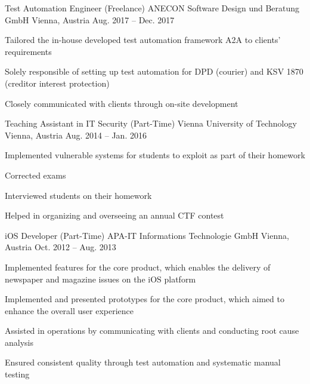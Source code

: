 \begin{cventries}

\cventry
{Test Automation Engineer (Freelance)} %
{ANECON Software Design und Beratung GmbH} %
{Vienna, Austria} %
{Aug. 2017 -- Dec. 2017} %
{ %
\begin{cvitems}
\item {Tailored the in-house developed test automation framework A2A to clients' requirements}
\item {Solely responsible of setting up test automation for DPD (courier) and KSV 1870 (creditor interest protection)}
\item {Closely communicated with clients through on-site development}
\end{cvitems}
}


\cventry
{Teaching Assistant in IT Security (Part-Time)} %
{Vienna University of Technology} %
{Vienna, Austria} %
{Aug. 2014 -- Jan. 2016} %
{ %
\begin{cvitems}
\item {Implemented vulnerable systems for students to exploit as part of their homework}
\item {Corrected exams}
\item {Interviewed students on their homework}
\item {Helped in organizing and overseeing an annual CTF contest}
\end{cvitems}
}


\cventry
{iOS Developer (Part-Time)} %
{APA-IT Informations Technologie GmbH} %
{Vienna, Austria} %
{Oct. 2012 -- Aug. 2013} %
{ %
\begin{cvitems}
\item {Implemented features for the core product, which enables the delivery of newspaper and magazine issues on the iOS platform}
\item {Implemented and presented prototypes for the core product, which aimed to enhance the overall user experience}
\item {Assisted in operations by communicating with clients and conducting root cause analysis}
\item {Ensured consistent quality through test automation and systematic manual testing}
\end{cvitems}
}


\end{cventries}